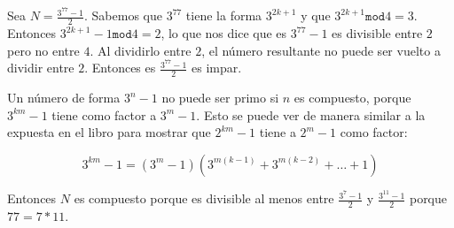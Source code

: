 \documentclass{article}
\begin{document}
\section{}

Sea $N = \frac{3^{77}-1}{2}$. Sabemos que $3^{77}$ tiene la forma
$3^{2k+1}$ y que $3^{2k+1} \mathtt{mod} 4 = 3$. Entonces
$3^{2k+1} - 1 \mathtt{mod} 4 = 2$, lo que nos dice que es $3^{77}-1$ es
divisible entre $2$ pero no entre $4$. Al dividirlo entre $2$, el número resultante
no puede ser vuelto a dividir entre $2$. Entonces es $\frac{3^{77}-1}{2}$ es impar.

Un número de forma $3^n-1$ no puede ser primo si $n$ es compuesto, porque
$3^{km}-1$ tiene como factor a $3^m-1$. Esto se puede ver de manera similar a
la expuesta en el libro para mostrar que $2^{km}-1$ tiene a $2^m-1$ como factor:

$$
3^{km}-1 = (3^m-1)(3^{m(k-1)}+3^{m(k-2)}+\ldots+1)
$$

Entonces $N$ es compuesto porque es divisible al menos entre $\frac{3^7-1}{2}$
y $\frac{3^{11}-1}{2}$ porque $77 = 7*11$.
\end{document}
